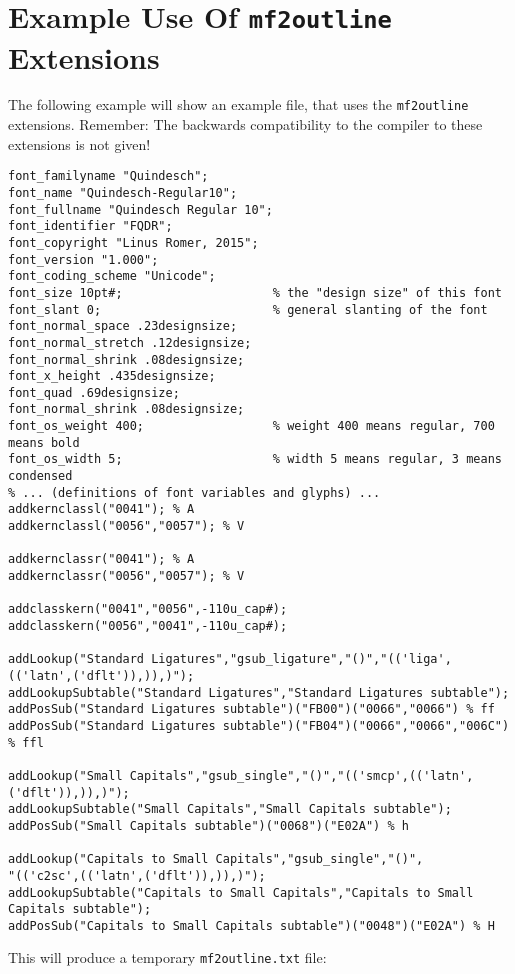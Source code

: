 \documentclass{scrartcl}
\begin{document}
\section{Example Use Of \texttt{mf2outline} Extensions}
%
The following example will show an example \MF{} file, that uses the \texttt{mf2outline} extensions. Remember: The backwards compatibility to the \MF{} compiler to these extensions is not given! 
\lstset{columns=fullflexible}
\begin{lstlisting}
font_familyname "Quindesch";
font_name "Quindesch-Regular10";
font_fullname "Quindesch Regular 10";
font_identifier "FQDR";
font_copyright "Linus Romer, 2015";
font_version "1.000";
font_coding_scheme "Unicode";
font_size 10pt#;                     % the "design size" of this font 
font_slant 0;                        % general slanting of the font   
font_normal_space .23designsize;
font_normal_stretch .12designsize;
font_normal_shrink .08designsize;
font_x_height .435designsize;
font_quad .69designsize;
font_normal_shrink .08designsize;
font_os_weight 400;                  % weight 400 means regular, 700 means bold
font_os_width 5;                     % width 5 means regular, 3 means condensed
% ... (definitions of font variables and glyphs) ...
addkernclassl("0041"); % A
addkernclassl("0056","0057"); % V

addkernclassr("0041"); % A
addkernclassr("0056","0057"); % V

addclasskern("0041","0056",-110u_cap#); 
addclasskern("0056","0041",-110u_cap#); 

addLookup("Standard Ligatures","gsub_ligature","()","(('liga',(('latn',('dflt')),)),)");
addLookupSubtable("Standard Ligatures","Standard Ligatures subtable");
addPosSub("Standard Ligatures subtable")("FB00")("0066","0066") % ff
addPosSub("Standard Ligatures subtable")("FB04")("0066","0066","006C") % ffl

addLookup("Small Capitals","gsub_single","()","(('smcp',(('latn',('dflt')),)),)");
addLookupSubtable("Small Capitals","Small Capitals subtable");
addPosSub("Small Capitals subtable")("0068")("E02A") % h

addLookup("Capitals to Small Capitals","gsub_single","()",
"(('c2sc',(('latn',('dflt')),)),)");
addLookupSubtable("Capitals to Small Capitals","Capitals to Small Capitals subtable");
addPosSub("Capitals to Small Capitals subtable")("0048")("E02A") % H
\end{lstlisting}
%
This will produce a temporary \texttt{mf2outline.txt} file:
\lstset{columns=fullflexible}
\end{document}
